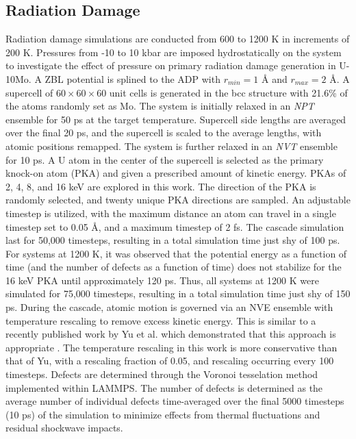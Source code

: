 \documentclass[review]{elsarticle}
\providecommand{\DIFadd}[1]{{\sf #1}} %
\providecommand{\DIFaddbegin}{\protect\color{blue}} %
\providecommand{\DIFaddend}{\protect\color{black}} %
\newcommand{\DIFaddincludegraphics}[2][]{{\color{blue}\fbox{\DIFOincludegraphics[#1]{#2}}}} %
\DeclareRobustCommand{\DIFaddbegin}{\DIFOaddbegin \let\includegraphics\DIFaddincludegraphics} %
\DeclareRobustCommand{\DIFaddend}{\DIFOaddend \let\includegraphics\DIFOincludegraphics} %
\begin{document}
\DIFaddend \subsection{Radiation Damage}

Radiation damage simulations are conducted from 600 to 1200 K in increments of 200 K. Pressures from -10 to 10 kbar are imposed hydrostatically on the system to investigate the effect of pressure on primary radiation damage generation in U-10Mo. A ZBL \cite{zbl} potential is splined to the ADP with $r_{min}=1$ {\AA} and $r_{max}=2$ {\AA}. A supercell of $60 \times 60 \times 60$ unit cells is generated in the bcc structure with 21.6\% of the atoms randomly set as Mo. The system is initially relaxed in an \textit{NPT} ensemble for 50 ps at the target temperature. Supercell side lengths are averaged over the final 20 ps, and the supercell is scaled to the average lengths, with atomic positions remapped. The system is further relaxed in an \textit{NVT} ensemble for 10 ps. A U atom in the center of the supercell is selected as the primary knock-on atom (PKA) and given a prescribed amount of kinetic energy. PKAs of 2, 4, 8, and 16 keV are explored in this work. The direction of the PKA is randomly selected, and twenty unique PKA directions are sampled. An adjustable timestep is utilized, with the maximum distance an atom can travel in a single timestep set to 0.05 {\AA}, and a maximum timestep of 2 fs. The cascade simulation last for 50,000 timesteps, resulting in a total simulation time just shy of 100 ps. For systems at 1200 K, it was observed that the potential energy as a function of time (and the number of defects as a function of time) does not stabilize for the 16 keV PKA until approximately 120 ps. Thus, all systems at 1200 K were simulated for 75,000 timesteps, resulting in a total simulation time just shy of 150 ps. During the cascade, atomic motion is governed via an NVE ensemble with temperature rescaling to remove excess kinetic energy. This is similar to a recently published work by Yu et al. which demonstrated that this approach is appropriate \cite{yu2024}. The temperature rescaling in this work is more conservative than that of Yu, with a rescaling fraction of 0.05, and rescaling occurring every 100 timesteps. \DIFaddbegin \DIFadd{Validation simulations were performed for select cases and demonstrated statistically significant differences, emphasizing the robustness of this method. }\DIFaddend Defects are determined through the Voronoi tesselation method implemented within LAMMPS. The number of defects is determined as the average number of individual defects time-averaged over the final 5000 timesteps (10 ps) of the simulation to minimize effects from thermal fluctuations and residual shockwave impacts. 
\end{document}
